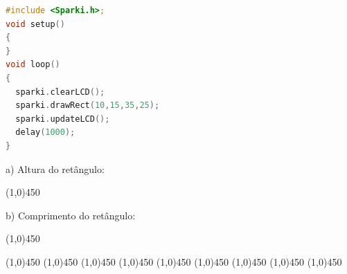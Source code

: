 
\begin{lstlisting}[language=C]
#include <Sparki.h>;
void setup()
{
}
void loop()
{
  sparki.clearLCD();
  sparki.drawRect(10,15,35,25);
  sparki.updateLCD();
  delay(1000);  
}
\end{lstlisting}

a) Altura do retângulo:
\begin{center}
    \line(1,0){450}
    \vspace{0.3cm}   
\end{center}
b) Comprimento do retângulo:
\begin{center}
    \line(1,0){450}
    \vspace{0.5cm}   
\end{center}

\begin{center}
    \line(1,0){450}
    \vspace{0.2cm}   
    \line(1,0){450}
    \vspace{0.2cm}   
    \line(1,0){450}
    \vspace{0.2cm}   
    \line(1,0){450}
    \vspace{0.2cm}   
    \line(1,0){450}
    \vspace{0.2cm}   
    \line(1,0){450}
    \vspace{0.2cm}   
    \line(1,0){450}
    \vspace{0.2cm}   
    \line(1,0){450}
    \vspace{0.2cm}   
    \line(1,0){450}
    \vspace{0.5cm}   
\end{center}
